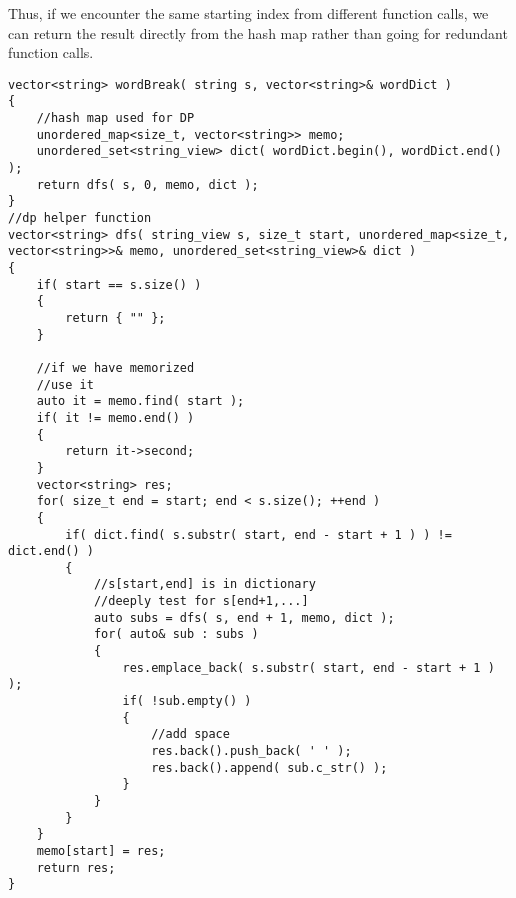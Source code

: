 Thus, if we encounter the same starting index from different function calls, we can return the result directly from the hash map rather than going for redundant function calls.
\setcounter{lstlisting}{0}
\begin{lstlisting}[style=customc, caption={DP With Memorization}]
vector<string> wordBreak( string s, vector<string>& wordDict )
{
    //hash map used for DP
    unordered_map<size_t, vector<string>> memo;
    unordered_set<string_view> dict( wordDict.begin(), wordDict.end() );
    return dfs( s, 0, memo, dict );
}
//dp helper function
vector<string> dfs( string_view s, size_t start, unordered_map<size_t, vector<string>>& memo, unordered_set<string_view>& dict )
{
    if( start == s.size() )
    {
        return { "" };
    }

    //if we have memorized
    //use it
    auto it = memo.find( start );
    if( it != memo.end() )
    {
        return it->second;
    }
    vector<string> res;
    for( size_t end = start; end < s.size(); ++end )
    {
        if( dict.find( s.substr( start, end - start + 1 ) ) != dict.end() )
        {
            //s[start,end] is in dictionary
            //deeply test for s[end+1,...]
            auto subs = dfs( s, end + 1, memo, dict );
            for( auto& sub : subs )
            {
                res.emplace_back( s.substr( start, end - start + 1 ) );
                if( !sub.empty() )
                {
                    //add space
                    res.back().push_back( ' ' );
                    res.back().append( sub.c_str() );
                }
            }
        }
    }
    memo[start] = res;
    return res;
}
\end{lstlisting}

